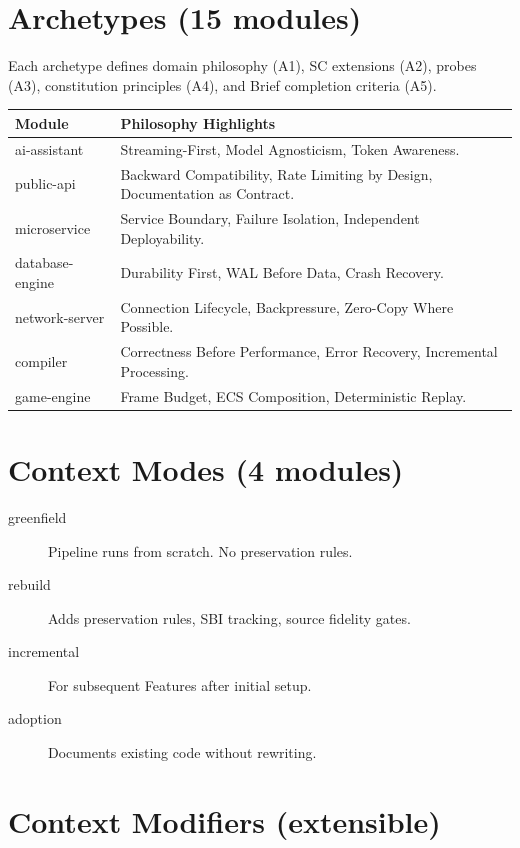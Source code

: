\documentclass[11pt,a4paper,openright,twoside]{report}
\begin{document}
\section{Archetypes (15 modules)}

Each archetype defines domain philosophy (A1), SC extensions (A2), probes (A3), constitution principles (A4), and Brief completion criteria (A5).

\begin{longtable}{lp{8cm}}
\toprule
\textbf{Module} & \textbf{Philosophy Highlights} \\
\midrule
\endhead
ai-assistant & Streaming-First, Model Agnosticism, Token Awareness. \\
public-api & Backward Compatibility, Rate Limiting by Design, Documentation as Contract. \\
microservice & Service Boundary, Failure Isolation, Independent Deployability. \\
database-engine & Durability First, WAL Before Data, Crash Recovery. \\
network-server & Connection Lifecycle, Backpressure, Zero-Copy Where Possible. \\
compiler & Correctness Before Performance, Error Recovery, Incremental Processing. \\
game-engine & Frame Budget, ECS Composition, Deterministic Replay. \\
\bottomrule
\end{longtable}

\section{Context Modes (4 modules)}

\begin{description}
  \item[greenfield] Pipeline runs from scratch. No preservation rules.
  \item[rebuild] Adds preservation rules, SBI tracking, source fidelity gates.
  \item[incremental] For subsequent Features after initial setup.
  \item[adoption] Documents existing code without rewriting.
\end{description}

\section{Context Modifiers (extensible)}
\end{document}
